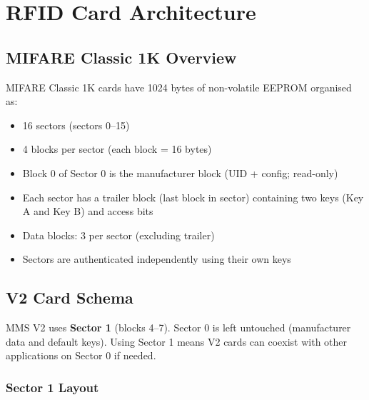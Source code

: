 \chapter{RFID Card Architecture}
\label{ch:rfid}

\section{MIFARE Classic 1K Overview}

MIFARE Classic 1K cards have 1024 bytes of non-volatile EEPROM organised as:
\begin{itemize}[leftmargin=1.5em]
    \item 16 sectors (sectors 0--15)
    \item 4 blocks per sector (each block = 16 bytes)
    \item Block 0 of Sector 0 is the manufacturer block (UID + config; read-only)
    \item Each sector has a trailer block (last block in sector) containing two keys (Key A and Key B) and access bits
    \item Data blocks: 3 per sector (excluding trailer)
    \item Sectors are authenticated independently using their own keys
\end{itemize}

\section{V2 Card Schema}

MMS V2 uses \textbf{Sector 1} (blocks 4--7). Sector 0 is left untouched (manufacturer data and default keys). Using Sector 1 means V2 cards can coexist with other applications on Sector 0 if needed.

\subsection{Sector 1 Layout}

